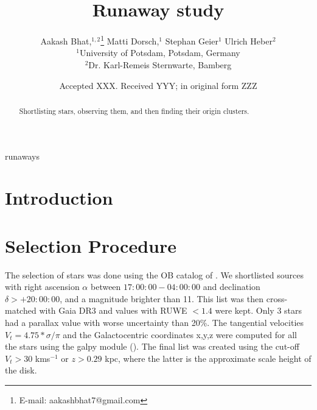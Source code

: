 \documentclass[fleqn,usenatbib]{mnras}
\title[Ondrejov]{Runaway study}
\author[Aakash Bhat et al.]{
Aakash Bhat,$^{1,2}$\thanks{E-mail: aakashbhat7@gmail.com}
Matti Dorsch,$^{1}$
Stephan Geier$^{1}$
Ulrich Heber$^{2}$
\\
$^{1}$University of Potsdam, Potsdam, Germany\\
$^{2}$Dr. Karl-Remeis Sternwarte, Bamberg
}
\date{Accepted XXX. Received YYY; in original form ZZZ}
\begin{document}
\label{firstpage}
\pagerange{\pageref{firstpage}--\pageref{lastpage}}
\maketitle

\begin{abstract}
Shortlisting stars, observing them, and then finding their origin clusters.
\end{abstract}

\begin{keywords}
runaways
\end{keywords}



\section{Introduction}


\section{Selection Procedure}

The selection of stars was done using the OB catalog of \citet{2003AJ....125.2531R}. We shortlisted sources with right ascension $\alpha$ between $17:00:00-04:00:00$ and declination $\delta>+20:00:00$, and a magnitude brighter than 11. This list was then cross-matched with Gaia DR3 and values with RUWE $<1.4$ were kept. Only 3 stars had a parallax value with worse uncertainty than 20\%. The tangential velocities $V_{t}=4.75*\sigma/\pi$ and the Galactocentric coordinates x,y,z were computed for all the stars using the galpy module (\cite{2015ApJS..216...29B}). The final list was created using the cut-off $V_{t}>30$ kms$^{-1}$ or $z>0.29$ kpc, where the latter is the approximate scale height of the disk.
\end{document}
